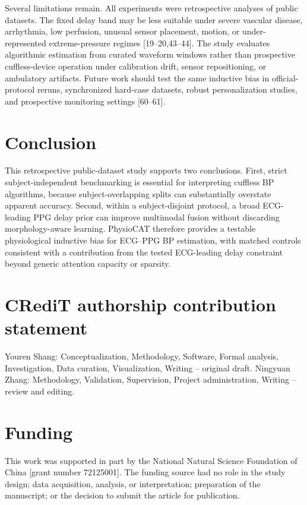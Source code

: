 \documentclass[preprint,12pt]{elsarticle}
\begin{document}
Several limitations remain. All experiments were retrospective analyses of public datasets. The fixed delay band may be less suitable under severe vascular disease, arrhythmia, low perfusion, unusual sensor placement, motion, or under-represented extreme-pressure regimes [19--20,43--44]. The study evaluates algorithmic estimation from curated waveform windows rather than prospective cuffless-device operation under calibration drift, sensor repositioning, or ambulatory artifacts. Future work should test the same inductive bias in official-protocol reruns, synchronized hard-case datasets, robust personalization studies, and prospective monitoring settings [60--61].
\section{Conclusion}

This retrospective public-dataset study supports two conclusions. First, strict subject-independent benchmarking is essential for interpreting cuffless BP algorithms, because subject-overlapping splits can substantially overstate apparent accuracy. Second, within a subject-disjoint protocol, a broad ECG-leading PPG delay prior can improve multimodal fusion without discarding morphology-aware learning. PhysioCAT therefore provides a testable physiological inductive bias for ECG--PPG BP estimation, with matched controls consistent with a contribution from the tested ECG-leading delay constraint beyond generic attention capacity or sparsity.
\section*{CRediT authorship contribution statement}

Youren Shang: Conceptualization, Methodology, Software, Formal analysis, Investigation, Data curation, Visualization, Writing -- original draft. Ningyuan Zhang: Methodology, Validation, Supervision, Project administration, Writing -- review and editing.

\section*{Funding}

This work was supported in part by the National Natural Science Foundation of China [grant number 72125001]. The funding source had no role in the study design; data acquisition, analysis, or interpretation; preparation of the manuscript; or the decision to submit the article for publication.
\end{document}
